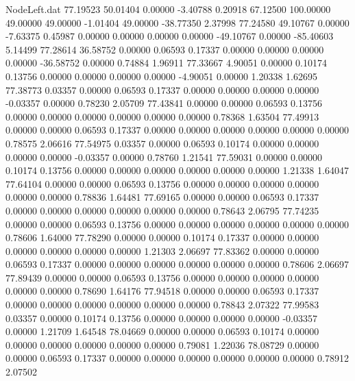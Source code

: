 \begin{filecontents}{NodeLeft.dat}
  77.19523   50.01404    0.00000    -3.40788    0.20918   67.12500  100.00000   49.00000   49.00000   -1.01404   49.00000  -38.77350    2.37998
  77.24580   49.10767    0.00000    -7.63375    0.45987    0.00000    0.00000    0.00000    0.00000  -49.10767    0.00000  -85.40603    5.14499
  77.28614   36.58752    0.00000     0.06593    0.17337    0.00000    0.00000    0.00000    0.00000  -36.58752    0.00000    0.74884    1.96911
  77.33667    4.90051    0.00000     0.10174    0.13756    0.00000    0.00000    0.00000    0.00000   -4.90051    0.00000    1.20338    1.62695
  77.38773    0.03357    0.00000     0.06593    0.17337    0.00000    0.00000    0.00000    0.00000   -0.03357    0.00000    0.78230    2.05709
  77.43841    0.00000    0.00000     0.06593    0.13756    0.00000    0.00000    0.00000    0.00000    0.00000    0.00000    0.78368    1.63504
  77.49913    0.00000    0.00000     0.06593    0.17337    0.00000    0.00000    0.00000    0.00000    0.00000    0.00000    0.78575    2.06616
  77.54975    0.03357    0.00000     0.06593    0.10174    0.00000    0.00000    0.00000    0.00000   -0.03357    0.00000    0.78760    1.21541
  77.59031    0.00000    0.00000     0.10174    0.13756    0.00000    0.00000    0.00000    0.00000    0.00000    0.00000    1.21338    1.64047
  77.64104    0.00000    0.00000     0.06593    0.13756    0.00000    0.00000    0.00000    0.00000    0.00000    0.00000    0.78836    1.64481
  77.69165    0.00000    0.00000     0.06593    0.17337    0.00000    0.00000    0.00000    0.00000    0.00000    0.00000    0.78643    2.06795
  77.74235    0.00000    0.00000     0.06593    0.13756    0.00000    0.00000    0.00000    0.00000    0.00000    0.00000    0.78606    1.64000
  77.78290    0.00000    0.00000     0.10174    0.17337    0.00000    0.00000    0.00000    0.00000    0.00000    0.00000    1.21303    2.06697
  77.83362    0.00000    0.00000     0.06593    0.17337    0.00000    0.00000    0.00000    0.00000    0.00000    0.00000    0.78606    2.06697
  77.89439    0.00000    0.00000     0.06593    0.13756    0.00000    0.00000    0.00000    0.00000    0.00000    0.00000    0.78690    1.64176
  77.94518    0.00000    0.00000     0.06593    0.17337    0.00000    0.00000    0.00000    0.00000    0.00000    0.00000    0.78843    2.07322
  77.99583    0.03357    0.00000     0.10174    0.13756    0.00000    0.00000    0.00000    0.00000   -0.03357    0.00000    1.21709    1.64548
  78.04669    0.00000    0.00000     0.06593    0.10174    0.00000    0.00000    0.00000    0.00000    0.00000    0.00000    0.79081    1.22036
  78.08729    0.00000    0.00000     0.06593    0.17337    0.00000    0.00000    0.00000    0.00000    0.00000    0.00000    0.78912    2.07502

\end{filecontents}
